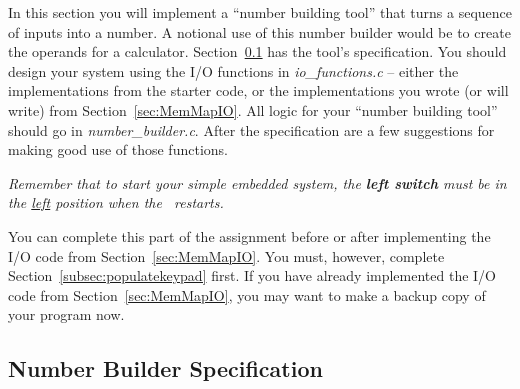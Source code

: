 In this section you will implement a ``number building tool'' that turns a sequence of inputs into a number.
A notional use of this number builder would be to create the operands for a calculator.
Section~\ref{subsec:functionalspecification} has the tool's specification.
You should design your system using the I/O functions in \textit{io\_functions.c} -- either the implementations from the starter code, or the implementations you wrote (or will write) from Section~\ref{sec:MemMapIO}.
All logic for your ``number building tool'' should go in \textit{number\_builder.c}.
After the specification are a few suggestions for making good use of those functions.

\textit{Remember that to start your simple embedded system, the \textbf{left switch} must be in the \underline{left} position when the \developmentboard\ restarts.}

You can complete this part of the assignment before or after implementing the I/O code from Section~\ref{sec:MemMapIO}.
You must, however, complete Section~\ref{subsec:populatekeypad} first.
If you have already implemented the I/O code from Section~\ref{sec:MemMapIO}, you may want to make a backup copy of your program now.


\subsection{Number Builder Specification} \label{subsec:functionalspecification}


